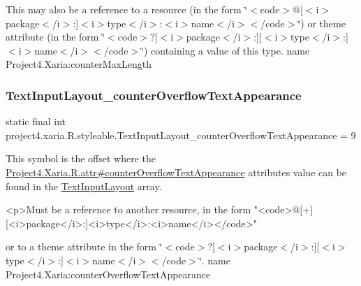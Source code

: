 This may also be a reference to a resource (in the form \char`\"{}$<$code$>$@\mbox{[}$<$i$>$package$<$/i$>$\+:\mbox{]}$<$i$>$type$<$/i$>$\+:$<$i$>$name$<$/i$>$$<$/code$>$\char`\"{}) or theme attribute (in the form \char`\"{}$<$code$>$?\mbox{[}$<$i$>$package$<$/i$>$\+:\mbox{]}\mbox{[}$<$i$>$type$<$/i$>$\+:\mbox{]}$<$i$>$name$<$/i$>$$<$/code$>$\char`\"{}) containing a value of this type.  name Project4.\+Xaria\+:counter\+Max\+Length \mbox{\label{classproject4_1_1xaria_1_1R_1_1styleable_afcc440aa8b04e1782ae4bcdcab6d0d74}} 
\subsubsection{\texorpdfstring{Text\+Input\+Layout\+\_\+counter\+Overflow\+Text\+Appearance}{TextInputLayout\_counterOverflowTextAppearance}}
{\footnotesize\ttfamily static final int project4.\+xaria.\+R.\+styleable.\+Text\+Input\+Layout\+\_\+counter\+Overflow\+Text\+Appearance = 9\hspace{0.3cm}{\ttfamily [static]}}

This symbol is the offset where the \hyperlink{}{Project4.\+Xaria.\+R.\+attr\#counter\+Overflow\+Text\+Appearance} attribute\textquotesingle{}s value can be found in the \hyperlink{classproject4_1_1xaria_1_1R_1_1styleable_a5a2e4611c17d75c805194b416b9fed74}{Text\+Input\+Layout} array.

\begin{DoxyVerb}      <p>Must be a reference to another resource, in the form "<code>@[+][<i>package</i>:]<i>type</i>:<i>name</i></code>"
\end{DoxyVerb}
 or to a theme attribute in the form \char`\"{}$<$code$>$?\mbox{[}$<$i$>$package$<$/i$>$\+:\mbox{]}\mbox{[}$<$i$>$type$<$/i$>$\+:\mbox{]}$<$i$>$name$<$/i$>$$<$/code$>$\char`\"{}.  name Project4.\+Xaria\+:counter\+Overflow\+Text\+Appearance \mbox{\label{classproject4_1_1xaria_1_1R_1_1styleable_a1317388c37206a92cac615b2e1bce472}} 

